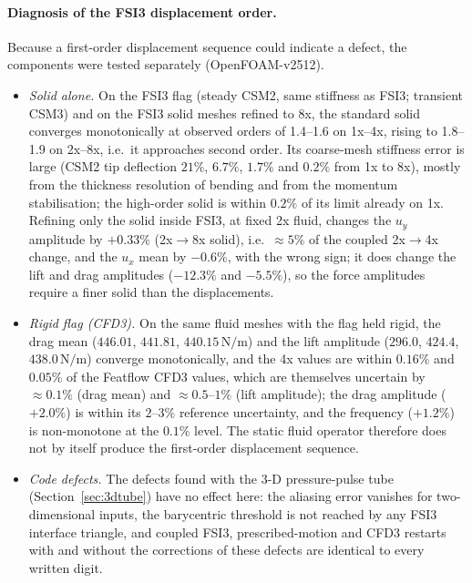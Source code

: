 \paragraph{Diagnosis of the FSI3 displacement order.}
Because a first-order displacement sequence could indicate a defect, the components were tested separately (OpenFOAM-v2512).
\begin{itemize}
	\item \emph{Solid alone.} On the FSI3 flag (steady CSM2, same stiffness as FSI3; transient CSM3) and on the FSI3 solid meshes refined to 8x, the standard solid converges monotonically at observed orders of 1.4--1.6 on 1x--4x, rising to 1.8--1.9 on 2x--8x, i.e.\ it approaches second order. Its coarse-mesh stiffness error is large (CSM2 tip deflection $21\%$, $6.7\%$, $1.7\%$ and $0.2\%$ from 1x to 8x), mostly from the thickness resolution of bending and from the momentum stabilisation; the high-order solid is within $0.2\%$ of its limit already on 1x. Refining only the solid inside FSI3, at fixed 2x fluid, changes the $u_y$ amplitude by $+0.33\%$ (2x$\to$8x solid), i.e.\ $\approx5\%$ of the coupled 2x$\to$4x change, and the $u_x$ mean by $-0.6\%$, with the wrong sign; it does change the lift and drag amplitudes ($-12.3\%$ and $-5.5\%$), so the force amplitudes require a finer solid than the displacements.
	\item \emph{Rigid flag (CFD3).} On the same fluid meshes with the flag held rigid, the drag mean ($446.01$, $441.81$, $440.15\,\mathrm{N/m}$) and the lift amplitude ($296.0$, $424.4$, $438.0\,\mathrm{N/m}$) converge monotonically, and the 4x values are within $0.16\%$ and $0.05\%$ of the Featflow CFD3 values, which are themselves uncertain by $\approx0.1\%$ (drag mean) and $\approx0.5$--$1\%$ (lift amplitude); the drag amplitude ($+2.0\%$) is within its $2$--$3\%$ reference uncertainty, and the frequency ($+1.2\%$) is non-monotone at the $0.1\%$ level. The static fluid operator therefore does not by itself produce the first-order displacement sequence.
	\item \emph{Code defects.} The defects found with the 3-D pressure-pulse tube (Section~\ref{sec:3dtube}) have no effect here: the aliasing error vanishes for two-dimensional inputs, the barycentric threshold is not reached by any FSI3 interface triangle, and coupled FSI3, prescribed-motion and CFD3 restarts with and without the corrections of these defects are identical to every written digit.

\end{itemize}
